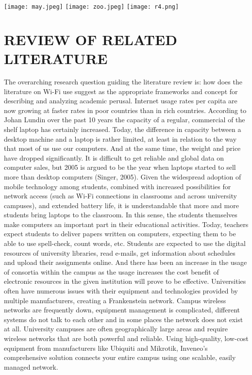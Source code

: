 ﻿\documentclass[10]{article}
\begin{document}
\texttt{[image: may.jpeg]}
\texttt{[image: zoo.jpeg]}
\texttt{[image: r4.png]}


	
\section{ REVIEW OF RELATED LITERATURE}
The overarching research question guiding the literature review is: how does the literature on Wi-Fi use suggest as the appropriate frameworks and concept for describing and analyzing academic perusal. Internet usage rates per capita are now growing at faster rates in poor countries than in rich countries. According to Johan Lundin over the past 10 years the capacity of a regular, commercial of the shelf laptop has certainly increased. Today, the difference in capacity between a desktop machine and a laptop is rather limited, at least in relation to the way that most of us use our computers. And at the same time, the weight and price have dropped significantly. It is difficult to get reliable and global data on computer sales, but 2005 is argued to be the year when laptops started to sell more than desktop computers (Singer, 2005). Given the widespread adoption of mobile technology among students, combined with increased possibilities for network access (such as Wi-Fi connections in classrooms and across university campuses), and extended battery life, it is understandable that more and more students bring laptops to the classroom. In this sense, the students themselves make computers an important part in their educational activities. Today, teachers expect students to deliver papers written on computers, expecting them to be able to use spell-check, count words, etc. Students are expected to use the digital resources of university libraries, read e-mails, get information about schedules and upload their assignments online. And there has been an increase in the usage of consortia within the campus as the usage increases the cost benefit of electronic resources in the given institution will prove to be effective.
Universities often have numerous issues with their equipment and technologies provided by multiple manufacturers, creating a Frankenstein network. Campus wireless networks are frequently down, equipment management is complicated, different systems do not talk to each other and in some places the network does not exist at all. University campuses are often geographically large areas and require wireless networks that are both powerful and reliable.
Using high-quality, low-cost equipment from manufacturers like Ubiquiti and Mikrotik, Inveneo’s comprehensive solution connects your entire campus using one scalable, easily managed network.
\end{document}
